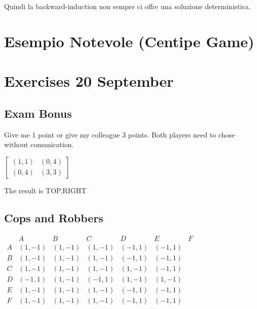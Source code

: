 \documentclass[10pt,a4paper]{report}
\begin{document}
        Quindi la backward-induction non sempre ci offre una soluzione deterministica.

        \section{Esempio Notevole (Centipe Game)}
        

        \section{Exercises 20 September}
        \subsection{Exam Bonus}
            Give me 1 point or give my colleague 3 points. Both players need to chose without comunication.

        \begin{center} 
            $
            \begin{bmatrix}
                (1,1) & (0,4) \\
                (0,4) & (3,3)
            \end{bmatrix}
            $
        \end{center}

        The result is TOP,RIGHT

        \subsection{Cops and Robbers}
        $
        \begin{matrix}
              &     A  &     B  &     C  &     D  &     E  &     F      \\
            A & (1,-1) & (1,-1) & (1,-1) & (-1,1) & (-1,1) &            \\
            B & (1,-1) & (1,-1) & (1,-1) & (-1,1) & (-1,1) &            \\
            C & (1,-1) & (1,-1) & (1,-1) & (1,-1) & (-1,1) &            \\
            D & (-1,1) & (1,-1) & (-1,1) & (1,-1) & (1,-1) &            \\
            E & (1,-1) & (1,-1) & (1,-1) & (-1,1) & (-1,1) &            \\
            F & (1,-1) & (1,-1) & (1,-1) & (-1,1) & (-1,1) &            \\
        \end{matrix}
        $
\end{document}
